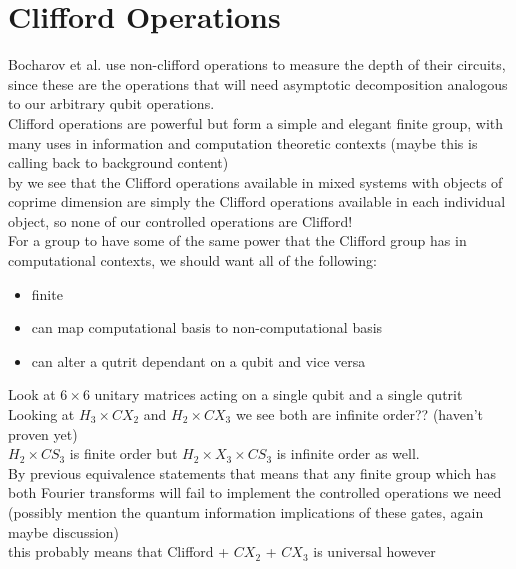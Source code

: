 \section{Clifford Operations}
Bocharov et al. use non-clifford operations to measure the depth of their circuits, since these are the operations that will need asymptotic decomposition analogous to our arbitrary qubit operations.
\\Clifford operations are powerful but form a simple and elegant finite group, with many uses in information and computation theoretic contexts (maybe this is calling back to background content)
\\by \cite{tolar-clifford} we see that the Clifford operations available in mixed systems with objects of coprime dimension are simply the Clifford operations available in each individual object, so none of our controlled operations are Clifford!
\\For a group to have some of the same power that the Clifford group has in computational contexts, we should want all of the following:
\begin{itemize}
	\item finite
	\item can map computational basis to non-computational basis
	\item can alter a qutrit dependant on a qubit and vice versa
\end{itemize}
Look at $6\times 6$ unitary matrices acting on a single qubit and a single qutrit
\\Looking at $H_3 \times CX_2$ and $H_2 \times CX_3$ we see both are infinite order?? (haven't proven yet)
\\$H_2 \times CS_3$ is finite order but $H_2 \times X_3 \times CS_3$ is infinite order as well.
\\By previous equivalence statements that means that any finite group which has both Fourier transforms will fail to implement the controlled operations we need
\\(possibly mention the quantum information implications of these gates, again maybe discussion)
\\this probably means that Clifford + $CX_2$ + $CX_3$ is universal however

